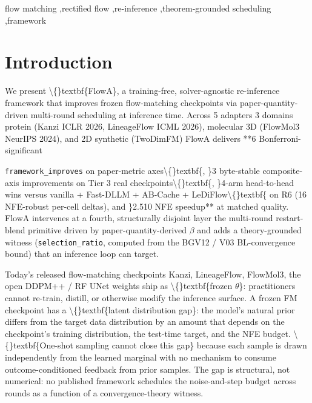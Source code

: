 \documentclass[preprint,3p,times,twocolumn]{elsarticle}
\title{}
\author{The Author}
\begin{document}
\begin{abstract}

\end{abstract}

\begin{keyword}
flow matching \sep rectified flow \sep re-inference \sep theorem-grounded scheduling \sep framework
\end{keyword}

\maketitle

\section{Introduction}
We present \textbackslash\{\}textbf\{FlowA\}, a training-free, solver-agnostic re-inference framework that improves frozen flow-matching checkpoints via paper-quantity-driven multi-round scheduling at inference time. Across 5 adapters  3 domains  protein (Kanzi ICLR 2026, LineageFlow ICML 2026), molecular 3D (FlowMol3 NeurIPS 2024), and 2D synthetic (TwoDimFM)  FlowA delivers **6 Bonferroni-significant

\texttt{framework\_improves} on paper-metric axes\textbackslash\{\}textbf\{, \}3 byte-stable composite-axis improvements on Tier 3 real checkpoints\textbackslash\{\}textbf\{, \}4-arm head-to-head wins versus vanilla + Fast-DLLM + AB-Cache + LeDiFlow\textbackslash\{\}textbf\{ on R6 (16 NFE-robust per-cell deltas), and \}2.510 NFE speedup** at matched quality. FlowA intervenes at a fourth, structurally disjoint layer  the multi-round restart-blend primitive driven by paper-quantity-derived $\beta$  and adds a theory-grounded witness (\texttt{selection\_ratio}, computed from the BGV12 / V03 BL-convergence bound) that an inference loop can target.

Today's released flow-matching checkpoints  Kanzi, LineageFlow, FlowMol3, the open DDPM++ / RF UNet weights  ship as \textbackslash\{\}textbf\{frozen $\theta$\}: practitioners cannot re-train, distill, or otherwise modify the inference surface. A frozen FM checkpoint has a \textbackslash\{\}textbf\{latent distribution gap\}: the model's natural prior differs from the target data distribution by an amount that depends on the checkpoint's training distribution, the test-time target, and the NFE budget. \textbackslash\{\}textbf\{One-shot sampling cannot close this gap\} because each sample is drawn independently from the learned marginal with no mechanism to consume outcome-conditioned feedback from prior samples. The gap is structural, not numerical: no published framework schedules the noise-and-step budget across rounds as a function of a convergence-theory witness.
\end{document}
